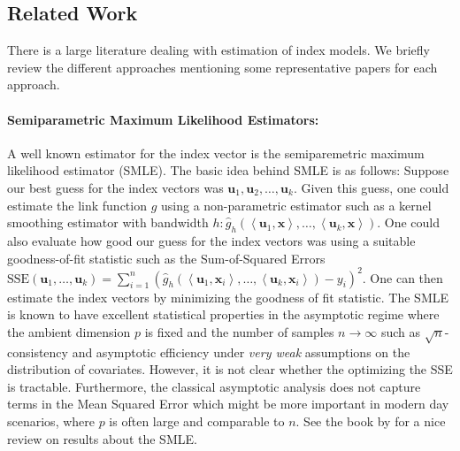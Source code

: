 \documentclass[final,12pt]{colt2018} %
\renewcommand\v[1]{{\ensuremath{\boldsymbol{#1}}}}
\newcommand\ip[1]{\left\langle #1 \right\rangle}
\begin{document}
\subsection{Related Work}

There is a large literature dealing with estimation of index models. We briefly review the different approaches mentioning some representative papers for each approach. 
\paragraph{Semiparametric Maximum Likelihood Estimators:}
A well known estimator for the index vector is the semiparemetric maximum likelihood estimator (SMLE). The basic idea behind SMLE is as follows: Suppose our best guess for the index vectors was $\v u_1, \v u_2, \dotsc, \v u_k$. Given this guess, one could estimate the link function $g$ using a non-parametric estimator such as a kernel smoothing estimator with bandwidth $h: \hat{g}_{h}(\ip{\v u_1,\v x}, \dotsc, \ip{\v u_k,\v x})$. One could also evaluate how good our guess for the index vectors was using a suitable goodness-of-fit statistic such as the Sum-of-Squared Errors %
    $\text{SSE}(\v u_1 , \dotsc, \v u_k) = \sum_{i=1}^n (\hat{g}_{h}(\ip{\v u_1,\v x_i}, \dotsc, \ip{\v u_k,\v x_i}) - y_i)^2$.
One can then estimate the index vectors by minimizing the goodness of fit statistic. %
The SMLE is known to have excellent statistical properties in the asymptotic regime where the ambient dimension $p$ is fixed and the number of samples $n \rightarrow \infty$ such as $\sqrt{n}$-consistency and asymptotic efficiency under \emph{very weak} assumptions on the distribution of covariates. However, it is not clear whether the optimizing the SSE is tractable.  Furthermore, the classical asymptotic analysis does not capture terms in the Mean Squared Error which might be more important in modern day scenarios, where $p$ is often large and comparable to $n$. See the book by \citet{horowitz2009semiparametric} for a nice review on results about the SMLE. 
\end{document}
